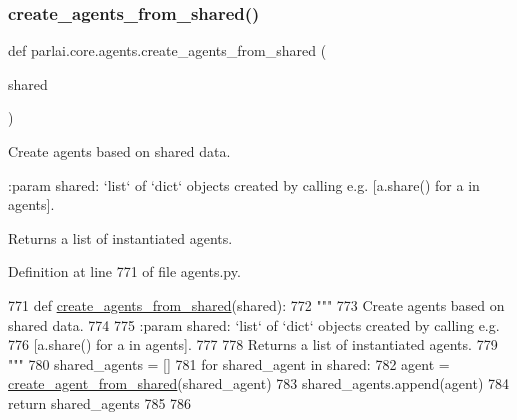 \subsubsection{\texorpdfstring{create\+\_\+agents\+\_\+from\+\_\+shared()}{create\_agents\_from\_shared()}}
{\footnotesize\ttfamily def parlai.\+core.\+agents.\+create\+\_\+agents\+\_\+from\+\_\+shared (\begin{DoxyParamCaption}\item[{}]{shared }\end{DoxyParamCaption})}

\begin{DoxyVerb}Create agents based on shared data.

:param shared: `list` of `dict` objects created by calling e.g.
    [a.share() for a in agents].

Returns a list of instantiated agents.
\end{DoxyVerb}
 

Definition at line 771 of file agents.\+py.


\begin{DoxyCode}
771 \textcolor{keyword}{def }\hyperlink{namespaceparlai_1_1core_1_1agents_a5600530545f5e60a79e2d657b5af1d8c}{create\_agents\_from\_shared}(shared):
772     \textcolor{stringliteral}{"""}
773 \textcolor{stringliteral}{    Create agents based on shared data.}
774 \textcolor{stringliteral}{}
775 \textcolor{stringliteral}{    :param shared: `list` of `dict` objects created by calling e.g.}
776 \textcolor{stringliteral}{        [a.share() for a in agents].}
777 \textcolor{stringliteral}{}
778 \textcolor{stringliteral}{    Returns a list of instantiated agents.}
779 \textcolor{stringliteral}{    """}
780     shared\_agents = []
781     \textcolor{keywordflow}{for} shared\_agent \textcolor{keywordflow}{in} shared:
782         agent = \hyperlink{namespaceparlai_1_1core_1_1agents_aa5af5dd1d2f9da491b60348d479b849f}{create\_agent\_from\_shared}(shared\_agent)
783         shared\_agents.append(agent)
784     \textcolor{keywordflow}{return} shared\_agents
785 
786 
\end{DoxyCode}
\mbox{\label{namespaceparlai_1_1core_1_1agents_ab4473fa54af02b5ab385b41b51dacd10}} 
